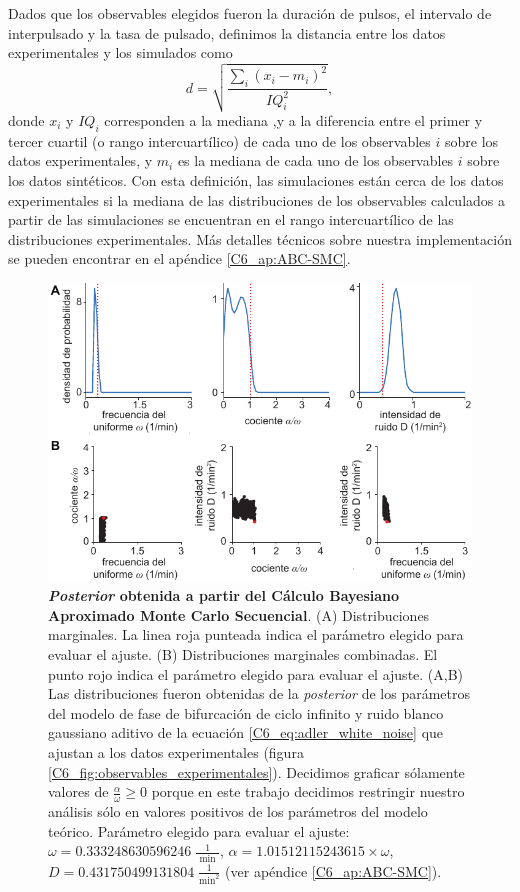 \documentclass[./main.tex]{subfiles}
\begin{document}
Dados que los observables elegidos fueron la duración de pulsos, el intervalo de interpulsado y la tasa de pulsado, definimos la distancia entre los datos experimentales y los simulados como
\begin{equation}
    d = \sqrt{\frac{\sum_i (x_i - m_i)^2}{IQ_i^2}},
    \label{C6_eq:distancia_MC}
\end{equation}
donde $x_i$ y $IQ_i$ corresponden a la mediana ,y a la diferencia entre el primer y tercer cuartil (o rango intercuartílico) de cada uno de los observables $i$ sobre los datos experimentales, y $m_i$ es la mediana de cada uno de los observables $i$ sobre los datos sintéticos. Con esta definición, las simulaciones están cerca de los datos experimentales si la mediana de las distribuciones de los observables calculados a partir de las simulaciones se encuentran en el rango intercuartílico de las distribuciones experimentales. Más detalles técnicos sobre nuestra implementación se pueden encontrar en el apéndice \ref{C6_ap:ABC-SMC}.

\begin{figure}
    \centering
    \includegraphics[width=1\columnwidth]{figures/chapter6/C6_fit_refval.pdf} 
    \caption{\textbf{\textit{Posterior} obtenida a partir del Cálculo Bayesiano Aproximado Monte Carlo Secuencial}. (A) Distribuciones marginales. La linea roja punteada indica el parámetro elegido para evaluar el ajuste. (B) Distribuciones marginales combinadas. El punto rojo indica el parámetro elegido para evaluar el ajuste. (A,B) Las distribuciones fueron obtenidas de la \textit{posterior} de los parámetros del modelo de fase de bifurcación de ciclo infinito y ruido blanco gaussiano aditivo de la ecuación \ref{C6_eq:adler_white_noise} que ajustan a los datos experimentales (figura \ref{C6_fig:observables_experimentales}). Decidimos graficar sólamente valores de $\frac{\alpha}{\omega} \geq 0$ porque en este trabajo decidimos restringir nuestro análisis sólo en valores positivos de los parámetros del modelo teórico. Parámetro elegido para evaluar el ajuste: $\omega = 0.333248630596246\;\frac{1}{\text{ min }}$, $\alpha = 1.01512115243615 \times \omega$, $ D = 0.431750499131804 \; \frac{1}{\text{min}^2}$ (ver apéndice \ref{C6_ap:ABC-SMC}).}
    \label{C6_fig:fit}
\end{figure} 
\end{document}
